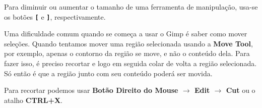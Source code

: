 \documentclass[12pt,onecolumn]{article}
\begin{document}
    \begin{framed}
      Para diminuir ou aumentar o tamanho de uma ferramenta de manipulação,
      usa-se os botões {\bf \verb$[$} e {\bf \verb$]$}, respectivamente.
    \end{framed}
    
    Uma dificuldade comum quando se começa a usar o Gimp é saber como mover
    seleções. Quando tentamos mover uma região selecionada usando a {\bf Move
    Tool}, por exemplo, apenas o contorno da região se move, e não o conteúdo
    dela. Para fazer isso, é preciso recortar e logo em seguida colar de volta a
    região selecionada. Só então é que a região junto com seu conteúdo poderá
    ser movida.
    
    \begin{framed}
      Para recortar podemos usar {\bf Botão Direito do Mouse $\rightarrow$ Edit
      $\rightarrow$ Cut} ou o atalho {\bf CTRL+X}.
    \end{framed}
    
        
\end{document}
